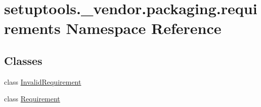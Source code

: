 \hypertarget{namespacesetuptools_1_1__vendor_1_1packaging_1_1requirements}{}\section{setuptools.\+\_\+vendor.\+packaging.\+requirements Namespace Reference}
\label{namespacesetuptools_1_1__vendor_1_1packaging_1_1requirements}
\subsection*{Classes}
\begin{DoxyCompactItemize}
\item 
class \hyperlink{classsetuptools_1_1__vendor_1_1packaging_1_1requirements_1_1_invalid_requirement}{Invalid\+Requirement}
\item 
class \hyperlink{classsetuptools_1_1__vendor_1_1packaging_1_1requirements_1_1_requirement}{Requirement}
\end{DoxyCompactItemize}
